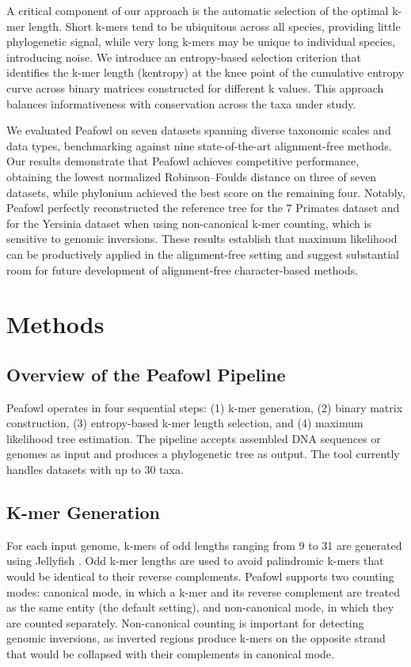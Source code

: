 \documentclass[12pt]{article}
\begin{document}
A critical component of our approach is the automatic selection of the optimal k-mer length. Short k-mers tend to be ubiquitous across all species, providing little phylogenetic signal, while very long k-mers may be unique to individual species, introducing noise. We introduce an entropy-based selection criterion that identifies the k-mer length (kentropy) at the knee point of the cumulative entropy curve across binary matrices constructed for different k values. This approach balances informativeness with conservation across the taxa under study.

We evaluated Peafowl on seven datasets spanning diverse taxonomic scales and data types, benchmarking against nine state-of-the-art alignment-free methods. Our results demonstrate that Peafowl achieves competitive performance, obtaining the lowest normalized Robinson--Foulds distance on three of seven datasets, while phylonium achieved the best score on the remaining four. Notably, Peafowl perfectly reconstructed the reference tree for the 7 Primates dataset and for the Yersinia dataset when using non-canonical k-mer counting, which is sensitive to genomic inversions. These results establish that maximum likelihood can be productively applied in the alignment-free setting and suggest substantial room for future development of alignment-free character-based methods.

\section{Methods}

\subsection{Overview of the Peafowl Pipeline}

Peafowl operates in four sequential steps: (1) k-mer generation, (2) binary matrix construction, (3) entropy-based k-mer length selection, and (4) maximum likelihood tree estimation. The pipeline accepts assembled DNA sequences or genomes as input and produces a phylogenetic tree as output. The tool currently handles datasets with up to 30 taxa.

\subsection{K-mer Generation}

For each input genome, k-mers of odd lengths ranging from 9 to 31 are generated using Jellyfish \citep{marcais2011}. Odd k-mer lengths are used to avoid palindromic k-mers that would be identical to their reverse complements. Peafowl supports two counting modes: canonical mode, in which a k-mer and its reverse complement are treated as the same entity (the default setting), and non-canonical mode, in which they are counted separately. Non-canonical counting is important for detecting genomic inversions, as inverted regions produce k-mers on the opposite strand that would be collapsed with their complements in canonical mode.
\end{document}
